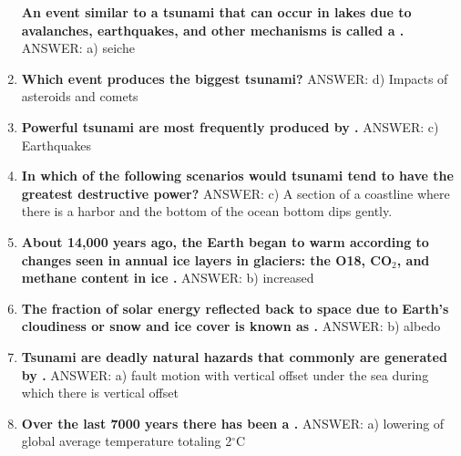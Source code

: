 \documentclass[10pt]{article}
\newcommand{\Rivpt}{\rule{.1pt}{1pt}}
\begin{document}
\begin{enumerate}
{\begin{samepage}
\textbf{
An event similar to a tsunami that can occur in lakes due to avalanches, earthquakes, and other mechanisms is called a \makebox[1cm]{\Rivpt\hrulefill\Rivpt}.
}
ANSWER: a)	seiche
\end{samepage}
}
\item {
\setlength{\itemsep}{0cm}
\setlength{\parskip}{.2cm}
\begin{samepage}
\textbf{
Which event produces the biggest tsunami?
}
ANSWER: d)	Impacts of asteroids and comets
\end{samepage}
}
\item {
\setlength{\itemsep}{0cm}
\setlength{\parskip}{.2cm}
\begin{samepage}
\textbf{
Powerful tsunami are most frequently produced by \makebox[1cm]{\Rivpt\hrulefill\Rivpt}.
}
ANSWER: c)	Earthquakes
\end{samepage}
}
\item {
\setlength{\itemsep}{0cm}
\setlength{\parskip}{.2cm}
\begin{samepage}
\textbf{
In which of the following scenarios would tsunami tend to have the greatest destructive power?
}
ANSWER: c)	A section of a coastline where there is a harbor and the bottom of the ocean bottom dips gently.
\end{samepage}
}
\item {
\setlength{\itemsep}{0cm}
\setlength{\parskip}{.2cm}
\begin{samepage}
\textbf{
About 14,000 years ago, the Earth began to warm according to changes seen in annual ice layers in glaciers: the O18, CO\ensuremath{_2}, and methane content in ice \makebox[1cm]{\Rivpt\hrulefill\Rivpt}.
}
ANSWER: b) increased
\end{samepage}
}
\item {
\setlength{\itemsep}{0cm}
\setlength{\parskip}{.2cm}
\begin{samepage}
\textbf{
The fraction of solar energy reflected back to space due to Earth's cloudiness or snow and ice cover is known as \makebox[1cm]{\Rivpt\hrulefill\Rivpt}.
}
ANSWER: b) albedo
\end{samepage}
}
\item {
\setlength{\itemsep}{0cm}
\setlength{\parskip}{.2cm}
\begin{samepage}
\textbf{
Tsunami are deadly natural hazards that commonly are generated by \makebox[1cm]{\Rivpt\hrulefill\Rivpt}.
}
ANSWER: a)	fault motion with vertical offset under the sea during which there is vertical offset
\end{samepage}
}
\item {
\setlength{\itemsep}{0cm}
\setlength{\parskip}{.2cm}
\begin{samepage}
\textbf{
Over the last 7000 years there has been a \makebox[1cm]{\Rivpt\hrulefill\Rivpt}.
}
ANSWER: a) lowering of global average temperature totaling 2\ensuremath{^\circ}C
\end{samepage}
}
\end{enumerate}
\end{document}

